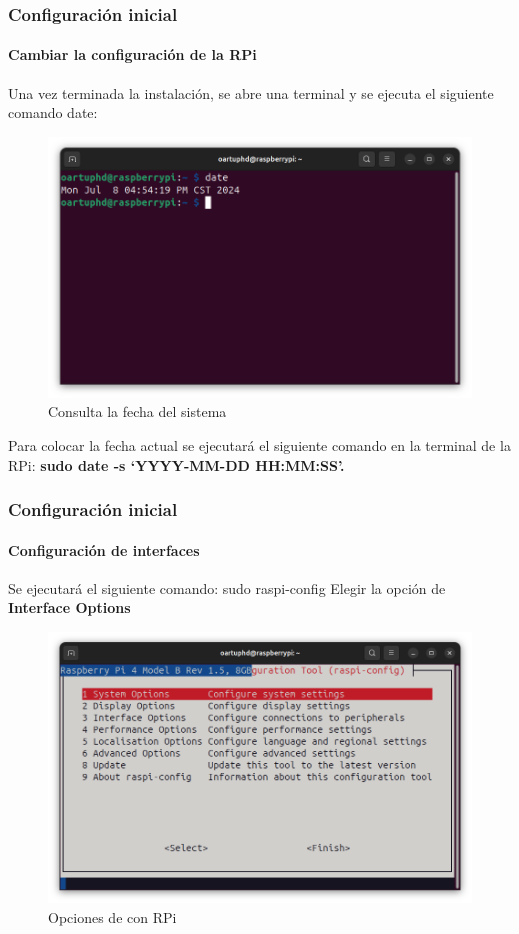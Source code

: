 \documentclass{beamer}
\begin{document}
	\begin{frame}
		\frametitle{Configuración inicial}
		\framesubtitle{Cambiar la configuración de la RPi}
		
		Una vez terminada la instalación, se abre una terminal y se ejecuta el siguiente comando date: 
		\begin{figure}
			\includegraphics[scale=0.25]{daterpi.png}
			\caption{Consulta la fecha del sistema}
		\end{figure}
		Para colocar la fecha actual se ejecutará el siguiente comando en la terminal de la RPi: \textbf{sudo date -s ‘YYYY-MM-DD HH:MM:SS'.}
		
	\end{frame}
	
	\begin{frame}
		\frametitle{Configuración inicial}
		\framesubtitle{Configuración de interfaces}
		Se ejecutará el siguiente comando: sudo raspi-config \newline
		Elegir la opción de \textbf{Interface Options}
		\begin{figure}
			\includegraphics[scale=0.3]{configrpi.png}
			\caption{Opciones de con RPi}
		\end{figure}
	
		
	\end{frame}
	
\end{document}
